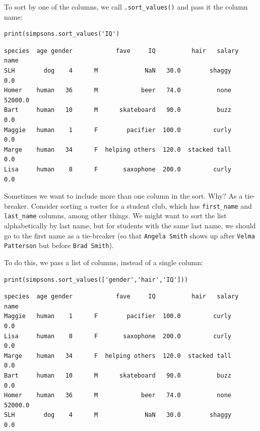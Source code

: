 To sort by one of the columns, we call \texttt{.sort\_values()} and pass it the
column name:

\begin{Verbatim}[fontsize=\small,samepage=true,frame=single,framesep=3mm]
print(simpsons.sort_values('IQ')
\end{Verbatim}
\vspace{-.2in}

\begin{Verbatim}[fontsize=\CBCodeSmall,samepage=true,frame=leftline,framesep=5mm,framerule=1mm]
       species  age gender            fave     IQ          hair   salary
name                                                                    
SLH        dog    4      M             NaN   30.0        shaggy      0.0
Homer    human   36      M            beer   74.0          none  52000.0
Bart     human   10      M      skateboard   90.0          buzz      0.0
Maggie   human    1      F        pacifier  100.0         curly      0.0
Marge    human   34      F  helping others  120.0  stacked tall      0.0
Lisa     human    8      F       saxophone  200.0         curly      0.0
\end{Verbatim}


Sometimes we want to include more than one column in the sort. Why? As a
tie-breaker. Consider sorting a roster for a student club, which has
\texttt{first\_name} and \texttt{last\_name} columns, among other things. We
might want to sort the list alphabetically by last name, but for students with
the same last name, we should go to the first name as a tie-breaker (so that
\texttt{Angela Smith} shows up after \texttt{Velma Patterson} but before
\texttt{Brad Smith}).

To do this, we pass a list of columns, instead of a single column:

\begin{samepage}
\begin{Verbatim}[fontsize=\small,samepage=true,frame=single,framesep=3mm]
print(simpsons.sort_values(['gender','hair','IQ']))
\end{Verbatim}
\vspace{-.2in}

\begin{Verbatim}[fontsize=\CBCodeSmall,samepage=true,frame=leftline,framesep=5mm,framerule=1mm]
       species  age gender            fave     IQ          hair   salary
name                                                                    
Maggie   human    1      F        pacifier  100.0         curly      0.0
Lisa     human    8      F       saxophone  200.0         curly      0.0
Marge    human   34      F  helping others  120.0  stacked tall      0.0
Bart     human   10      M      skateboard   90.0          buzz      0.0
Homer    human   36      M            beer   74.0          none  52000.0
SLH        dog    4      M             NaN   30.0        shaggy      0.0
\end{Verbatim}
\end{samepage}

